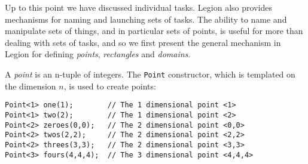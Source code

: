 Up to this point we have discussed individual tasks.  Legion also provides mechanisms for
naming and launching sets of tasks.  The ability to name and manipulate sets of things, and 
in particular sets of points, is useful for
more than dealing with sets of tasks, and so we first present the general mechanism in
Legion for defining {\em points}, {\em rectangles} and {\em domains}.

A {\em point} is an n-tuple of integers.  The {\tt Point} constructor, which is templated on the
dimension $n$,  is used to create points:
\begin{verbatim}
Point<1> one(1);        // The 1 dimensional point <1>
Point<1> two(2);        // The 1 dimensional point <2>
Point<2> zeroes(0,0);   // The 2 dimensional point <0,0>
Point<2> twos(2,2);     // The 2 dimensional point <2,2>
Point<2> threes(3,3);   // The 2 dimensional point <3,3>
Point<3> fours(4,4,4);  // The 3 dimensional point <4,4,4>
\end{verbatim}

